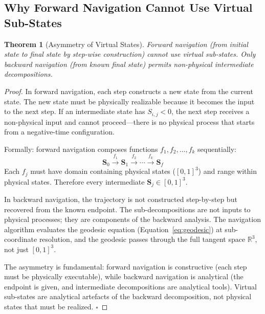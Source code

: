 \documentclass[12pt,twocolumn]{article}
\newtheorem{theorem}{Theorem}[section]
\begin{document}
\subsection{Why Forward Navigation Cannot Use Virtual Sub-States}

\begin{theorem}[Asymmetry of Virtual States]
\label{thm:forward_no_virtual}
Forward navigation (from initial state to final state by step-wise construction) cannot use virtual sub-states. Only backward navigation (from known final state) permits non-physical intermediate decompositions.
\end{theorem}

\begin{proof}
In forward navigation, each step constructs a new state from the current state. The new state must be physically realizable because it becomes the input to the next step. If an intermediate state has $S_{i,j} < 0$, the next step receives a non-physical input and cannot proceed---there is no physical process that starts from a negative-time configuration.

Formally: forward navigation composes functions $f_1, f_2, \ldots, f_k$ sequentially:
\begin{equation}
\mathbf{S}_0 \xrightarrow{f_1} \mathbf{S}_1 \xrightarrow{f_2} \cdots \xrightarrow{f_k} \mathbf{S}_f
\end{equation}
Each $f_j$ must have domain containing physical states ($[0,1]^3$) and range within physical states. Therefore every intermediate $\mathbf{S}_j \in [0,1]^3$.

In backward navigation, the trajectory is not constructed step-by-step but recovered from the known endpoint. The sub-decompositions are not inputs to physical processes; they are components of the backward analysis. The navigation algorithm evaluates the geodesic equation (Equation~\ref{eq:geodesic}) at sub-coordinate resolution, and the geodesic passes through the full tangent space $\mathbb{R}^3$, not just $[0,1]^3$.

The asymmetry is fundamental: forward navigation is constructive (each step must be physically executable), while backward navigation is analytical (the endpoint is given, and intermediate decompositions are analytical tools). Virtual sub-states are analytical artefacts of the backward decomposition, not physical states that must be realized. $\square$
\end{proof}
\end{document}
